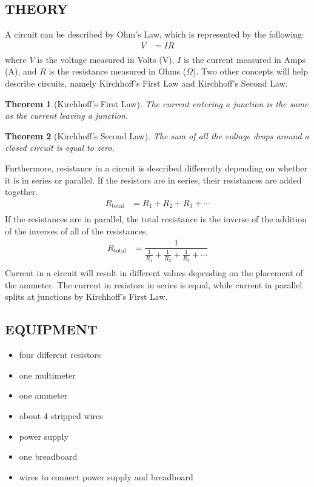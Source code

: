 \documentclass [12pt, letterpaper, twoside] {article}
\newtheorem{theorem}{Theorem}
\begin{document}
\subsection* {THEORY}
\noindent
A circuit can be described by Ohm's Law, which is represented by the following:
\begin{equation}
  \begin{split}
    V &= IR \\
  \end{split}
\end{equation}
where \(V\) is the voltage measured in Volts (V), \(I\) is the current measured in Amps (A), and \(R\) is the resistance measured in Ohms (\(\Omega\)). Two other concepts will help describe circuits, namely Kirchhoff's First Law and Kirchhoff's Second Law.
\begin{theorem}[Kirchhoff's First Law]
  The current entering a junction is the same as the current leaving a junction.
\end{theorem}
\begin{theorem}[Kirchhoff's Second Law]
  The sum of all the voltage drops around a closed circuit is equal to zero.
\end{theorem}
Furthermore, resistance in a circuit is described differently depending on whether it is in series or parallel. If the resistors are in series, their resistances are added together.
\begin{equation}
  \begin{split}
    R_{\text{total}} &= R_{1} + R_{2} + R_{3} + \cdots \\
  \end{split}
\end{equation}
If the resistances are in parallel, the total resistance is the inverse of the addition of the inverses of all of the resistances.
\begin{equation}
  \begin{split}
    R_{\text{total}} &= \dfrac{1}{\tfrac{1}{R_{1}} + \tfrac{1}{R_{2}} + \tfrac{1}{R_{3}} + \cdots} \\
  \end{split}
\end{equation}
Current in a circuit will result in different values depending on the placement of the ammeter. The current in resistors in series is equal, while current in parallel splits at junctions by Kirchhoff's First Law. 

\subsection* {EQUIPMENT}
  \noindent
  \begin {itemize}
    \itemsep0em
    \item {four different resistors}
    \item {one multimeter}
    \item {one ammeter}
    \item {about 4 stripped wires}
    \item {power supply}
    \item {one breadboard}
    \item {wires to connect power supply and breadboard}
  \end {itemize}
\end{document}
